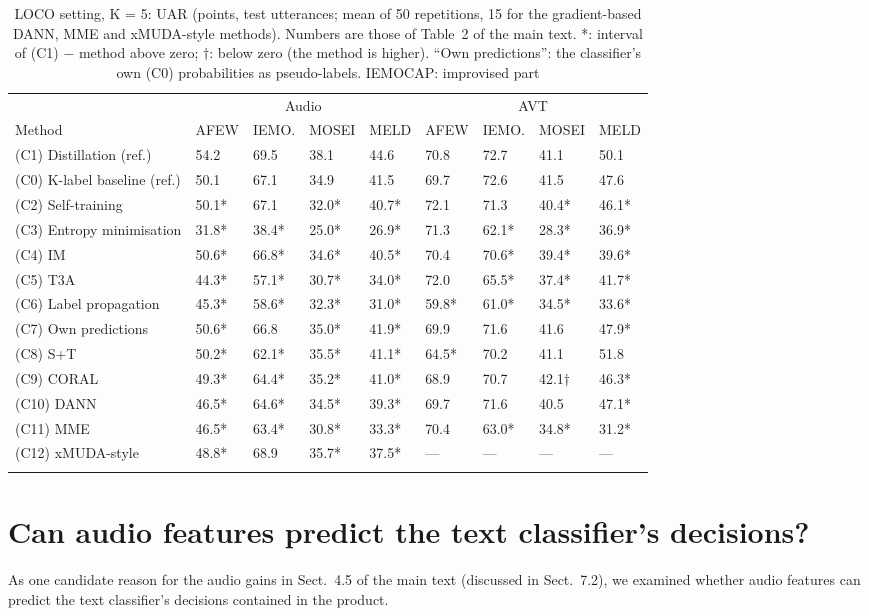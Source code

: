 \documentclass[sn-nature,pdflatex]{sn-jnl}
\begin{document}
\begin{table}[h]
\caption{LOCO setting, K = 5: UAR (points, test utterances; mean of 50 repetitions, 15 for the gradient-based DANN, MME and xMUDA-style methods). Numbers are those of Table~2 of the main text. *: interval of (C1) $-$ method above zero; $\dagger$: below zero (the method is higher). ``Own predictions'': the classifier's own (C0) probabilities as pseudo-labels. IEMOCAP: improvised part}\label{tab:methods}
\footnotesize\setlength{\tabcolsep}{4pt}
\begin{tabular}{@{}lllllllll@{}}
\toprule
 & \multicolumn{4}{c}{Audio} & \multicolumn{4}{c}{AVT} \\
Method & AFEW & IEMO. & MOSEI & MELD & AFEW & IEMO. & MOSEI & MELD \\
\midrule
(C1) Distillation (ref.) & 54.2 & 69.5 & 38.1 & 44.6 & 70.8 & 72.7 & 41.1 & 50.1 \\
(C0) K-label baseline (ref.) & 50.1 & 67.1 & 34.9 & 41.5 & 69.7 & 72.6 & 41.5 & 47.6 \\
(C2) Self-training & 50.1* & 67.1 & 32.0* & 40.7* & 72.1 & 71.3 & 40.4* & 46.1* \\
(C3) Entropy minimisation & 31.8* & 38.4* & 25.0* & 26.9* & 71.3 & 62.1* & 28.3* & 36.9* \\
(C4) IM & 50.6* & 66.8* & 34.6* & 40.5* & 70.4 & 70.6* & 39.4* & 39.6* \\
(C5) T3A & 44.3* & 57.1* & 30.7* & 34.0* & 72.0 & 65.5* & 37.4* & 41.7* \\
(C6) Label propagation & 45.3* & 58.6* & 32.3* & 31.0* & 59.8* & 61.0* & 34.5* & 33.6* \\
(C7) Own predictions & 50.6* & 66.8 & 35.0* & 41.9* & 69.9 & 71.6 & 41.6 & 47.9* \\
(C8) S+T & 50.2* & 62.1* & 35.5* & 41.1* & 64.5* & 70.2 & 41.1 & 51.8 \\
(C9) CORAL & 49.3* & 64.4* & 35.2* & 41.0* & 68.9 & 70.7 & 42.1$\dagger$ & 46.3* \\
(C10) DANN & 46.5* & 64.6* & 34.5* & 39.3* & 69.7 & 71.6 & 40.5 & 47.1* \\
(C11) MME & 46.5* & 63.4* & 30.8* & 33.3* & 70.4 & 63.0* & 34.8* & 31.2* \\
(C12) xMUDA-style & 48.8* & 68.9 & 35.7* & 37.5* & --- & --- & --- & --- \\
\botrule
\end{tabular}
\end{table}

\section{Can audio features predict the text classifier's decisions?}\label{sec:s3}
As one candidate reason for the audio gains in Sect.~4.5 of the main text (discussed in Sect.~7.2), we examined whether audio features can predict the text classifier's decisions contained in the product.
\end{document}
